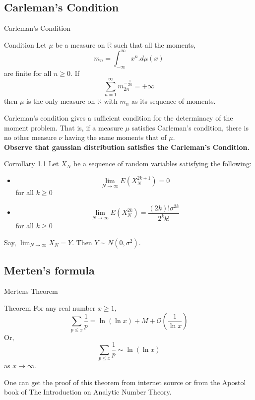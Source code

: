 \documentclass{beamer}
\numberwithin{theorem}{section}
\theoremstyle{definition}
\begin{document}
       \subsection{Carleman's Condition}
       \begin{frame}{Carleman's Condition}
        \begin{block}{Condition}
        Let $\mu$ be a measure on $\mathbb{R}$ such that all the moments,
        $$m_n=\int_{-\infty}^{\infty}x^n.d\mu(x)$$ are finite for all $n\ge 0$.
        If $$\sum_{n=1}^{\infty}m_{2n}^{-\frac{1}{2n}}=+\infty$$ then $\mu$ is the only measure on $\mathbb{R}$ with $m_n$ as its sequence of moments.
            
        \end{block}
           
       \end{frame}
       \begin{frame}{}
       Carleman's condition gives a sufficient condition for the determinacy of the moment problem. That is, if a measure 
        $\mu$ satisfies Carleman's condition, there is no other measure $\nu$ having the same moments that of $\mu$.\\
        \textbf{Observe that gaussian distribution satisfies the Carleman's Condition. }
           
       \end{frame}
       \begin{frame}{}
       \begin{block}{Corrollary 1.1}
           Let $X_N$ be a sequence of random variables satisfying the following:
           \begin{itemize}
               \item $$\lim_{N\rightarrow\infty}E(X_N^{2k+1})=0$$ for all $k\ge 0$
               \item $$\lim_{N\rightarrow\infty}E(X_N^{2k})=\frac{(2k)!\sigma^{2k}}{2^kk!}$$ for all $k\ge 0$
           \end{itemize}
           Say, $\lim_{N\rightarrow\infty}X_N=Y$. Then $Y\sim N(0,\sigma^2)$.
       \end{block}
           
       \end{frame}
       \subsection{Merten's formula}
       \begin{frame}{Mertens Theorem}
       \begin{block}{Theorem}
           For any real number $x\ge 1$,
           $$\sum_{p\le x}\frac{1}{p}=\ln(\ln x)+M+\mathcal{O}\left(\frac{1}{\ln x}\right)$$
           Or, $$\sum_{p\le x}\frac{1}{p}\sim \ln(\ln x)$$ as $x\rightarrow\infty$.
       \end{block}
       One can get the proof of this theorem from internet source or from the Apostol book of The Introduction on Analytic Number Theory.
           
       \end{frame}
\end{document}
